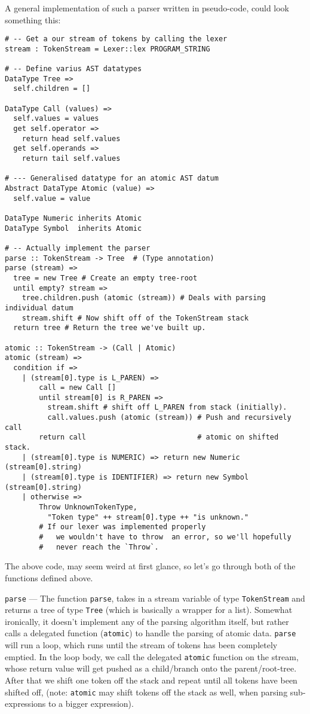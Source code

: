 \documentclass{article}
\newcommand{\code}[1]{\texttt{#1}}
\begin{document}
      A general implementation of such a parser written in pseudo-code,
      could look something this:
      \clearpage
      \begin{verbatim}
# -- Get a our stream of tokens by calling the lexer
stream : TokenStream = Lexer::lex PROGRAM_STRING

# -- Define varius AST datatypes
DataType Tree =>
  self.children = []

DataType Call (values) =>
  self.values = values
  get self.operator =>
    return head self.values
  get self.operands =>
    return tail self.values

# --- Generalised datatype for an atomic AST datum
Abstract DataType Atomic (value) =>
  self.value = value

DataType Numeric inherits Atomic
DataType Symbol  inherits Atomic

# -- Actually implement the parser
parse :: TokenStream -> Tree  # (Type annotation)
parse (stream) =>
  tree = new Tree # Create an empty tree-root
  until empty? stream =>
    tree.children.push (atomic (stream)) # Deals with parsing individual datum
    stream.shift # Now shift off of the TokenStream stack
  return tree # Return the tree we've built up.

atomic :: TokenStream -> (Call | Atomic)
atomic (stream) =>
  condition if =>
    | (stream[0].type is L_PAREN) =>
        call = new Call []
        until stream[0] is R_PAREN =>
          stream.shift # shift off L_PAREN from stack (initially).
          call.values.push (atomic (stream)) # Push and recursively call
        return call                          # atomic on shifted stack.
    | (stream[0].type is NUMERIC) => return new Numeric (stream[0].string)
    | (stream[0].type is IDENTIFIER) => return new Symbol (stream[0].string)
    | otherwise =>
        Throw UnknownTokenType,
          "Token type" ++ stream[0].type ++ "is unknown."
        # If our lexer was implemented properly
        #   we wouldn't have to throw  an error, so we'll hopefully
        #   never reach the `Throw`.

      \end{verbatim}
      \clearpage

      The above code, may seem weird at first glance, so let's go through
      both of the functions defined above.

      \code{parse} --- The function \code{parse}, takes in a stream variable of
      type \code{TokenStream} and returns a tree of type \code{Tree} (which is
      basically a wrapper for a list).  Somewhat ironically, it doesn't implement
      any of the parsing algorithm itself, but rather calls a delegated
      function (\code{atomic}) to handle the parsing of atomic data. \code{parse}
      will run a loop, which runs until the stream of tokens has been completely
      emptied. In the loop body, we call the delegated \code{atomic} function on
      the stream, whose return value will get pushed as a child/branch onto the
      parent/root-tree. After that we shift one token off the stack and repeat
      until all tokens have been shifted off, (note: \code{atomic} may shift
      tokens off the stack as well, when parsing sub-expressions to a bigger
      expression).
\end{document}
